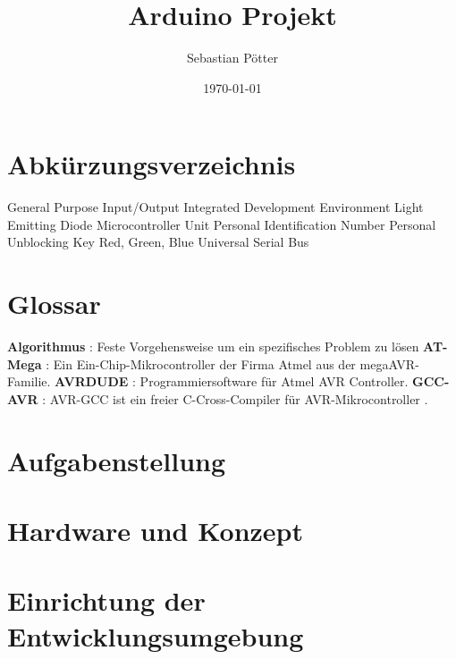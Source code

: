 \documentclass[12pt]{article}
\title{Arduino Projekt}
\author{Sebastian Pötter}
\date{\today}
\begin{document}
    
    \newpage
    

    \tableofcontents
    \newpage
    
    \section*{Abkürzungsverzeichnis}
        \begin{acronym}
             {General Purpose Input/Output}
             {Integrated Development Environment}
             {Light Emitting Diode}
             {Microcontroller Unit}
             {Personal Identification Number}
             {Personal Unblocking Key} 
             {Red, Green, Blue}
             {Universal Serial Bus}
        \end{acronym}
        
    \section*{Glossar}
        \textbf{Algorithmus} : Feste Vorgehensweise um ein spezifisches Problem zu lösen 
        \newline
        \textbf{AT-Mega} : Ein Ein-Chip-Mikrocontroller der Firma Atmel aus der megaAVR-Familie.
        \newline
        \textbf{AVRDUDE} : Programmiersoftware für Atmel AVR Controller.
        \newline
        \textbf{GCC-AVR} : AVR-GCC ist ein freier C-Cross-Compiler für AVR-Mikrocontroller \cite{online:avr}. 
        \newline
        
    
    \newpage

     \section{Aufgabenstellung}
               
        
    \section{Hardware und Konzept} 
                

    \section{Einrichtung der Entwicklungsumgebung}
        
\end{document}
